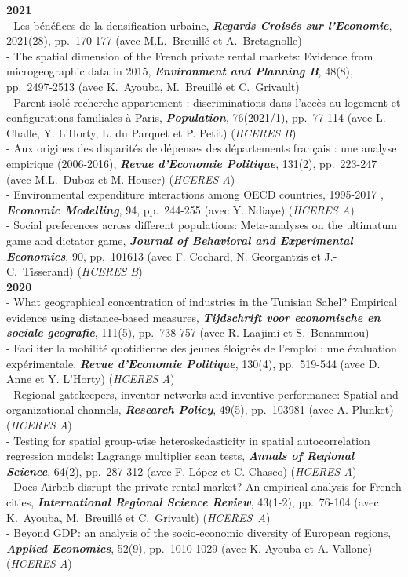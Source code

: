 \documentclass[a4paper,12pt]{article}
\begin{document}
\noindent \textbf{2021}  \smallskip \\ 
- Les bénéfices de la densification urbaine, \textit{\textbf{Regards Croisés sur l'Economie}}, 2021(28), pp.~170-177 (avec M.L.~Breuillé et A.~Bretagnolle)\\
- The spatial dimension of the French private rental markets: Evidence from microgeographic data in 2015,
\textit{\textbf{Environment and Planning B}}, 48(8), pp.~2497-2513 (avec K.~Ayouba, M.~Breuillé et C.~Grivault)\\
- Parent isolé recherche appartement : discriminations dans l'accès au logement et configurations familiales à Paris, \textit{\textbf{Population}}, 76(2021/1), pp.~77-114 (avec L. Challe, Y. L'Horty, L. du Parquet et P. Petit) (\textit{HCERES B})\\	
- Aux origines des disparités de dépenses des départements fran\c cais : une analyse empirique (2006-2016), \textit{\textbf{Revue d'Economie Politique}}, 131(2), pp.~223-247 (avec M.L.~Duboz et M. Houser) (\textit{HCERES A})\\
- Environmental expenditure interactions among OECD countries, 1995-2017 , \textit{\textbf{Economic Modelling}}, 94, pp.~244-255 (avec Y. Ndiaye) (\textit{HCERES A})\\
- Social preferences across different populations: Meta-analyses on the ultimatum game and dictator game, \textit{\textbf{Journal of Behavioral and Experimental Economics}}, 90, pp.~101613 (avec F. Cochard, N. Georgantzis et J.-C.~Tisserand) (\textit{HCERES B}) \\ 

\noindent \textbf{2020}  \smallskip \\ 
- What geographical concentration of industries in the Tunisian Sahel? Empirical evidence using distance-based measures, \textit{\textbf{Tijdschrift voor economische en sociale geografie}}, 111(5), pp.~738-757 (avec R. Laajimi et S.~Benammou) \\	
- Faciliter la mobilité quotidienne des jeunes éloignés de l'emploi : une évaluation expérimentale, \textit{\textbf{Revue d'Economie Politique}}, 130(4), pp.~519-544 (avec D. Anne et Y. L'Horty) (\textit{HCERES A})\\
- Regional gatekeepers, inventor networks and inventive performance: Spatial and organizational channels, \textit{\textbf{Research Policy}}, 49(5), pp.~103981 (avec A. Plunket) (\textit{HCERES A})\\	
- Testing for spatial group-wise heteroskedasticity in spatial autocorrelation regression models: Lagrange multiplier scan tests, \textit{\textbf{Annals of Regional Science}}, 64(2), pp.~287-312 (avec F. López et C. Chasco) (\textit{HCERES A})\\
- Does Airbnb disrupt the private rental market? An empirical analysis for French cities, \textit{\textbf{International Regional Science Review}}, 43(1-2), pp.~76-104 (avec K.~Ayouba, M.~Breuillé et C.~Grivault) (\textit{HCERES~A}) \\		
- Beyond GDP: an analysis of the socio-economic diversity of European regions, \textit{\textbf{Applied Economics}}, 52(9), pp.~1010-1029 (avec K. Ayouba et A. Vallone) (\textit{HCERES A})\\
\end{document}
